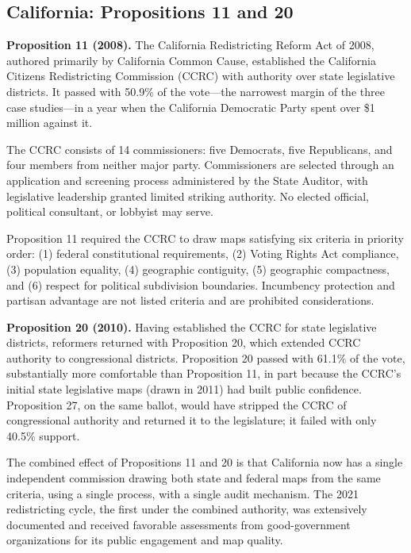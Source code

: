 \subsection{California: Propositions 11 and 20}

\textbf{Proposition 11 (2008).} The California Redistricting Reform Act of 2008, authored primarily by California Common Cause, established the California Citizens Redistricting Commission (CCRC) with authority over state legislative districts. It passed with 50.9\% of the vote---the narrowest margin of the three case studies---in a year when the California Democratic Party spent over \$1 million against it.

The CCRC consists of 14 commissioners: five Democrats, five Republicans, and four members from neither major party. Commissioners are selected through an application and screening process administered by the State Auditor, with legislative leadership granted limited striking authority. No elected official, political consultant, or lobbyist may serve.

Proposition 11 required the CCRC to draw maps satisfying six criteria in priority order: (1) federal constitutional requirements, (2) Voting Rights Act compliance, (3) population equality, (4) geographic contiguity, (5) geographic compactness, and (6) respect for political subdivision boundaries. Incumbency protection and partisan advantage are not listed criteria and are prohibited considerations.

\textbf{Proposition 20 (2010).} Having established the CCRC for state legislative districts, reformers returned with Proposition 20, which extended CCRC authority to congressional districts. Proposition 20 passed with 61.1\% of the vote, substantially more comfortable than Proposition 11, in part because the CCRC's initial state legislative maps (drawn in 2011) had built public confidence. Proposition 27, on the same ballot, would have stripped the CCRC of congressional authority and returned it to the legislature; it failed with only 40.5\% support.

The combined effect of Propositions 11 and 20 is that California now has a single independent commission drawing both state and federal maps from the same criteria, using a single process, with a single audit mechanism. The 2021 redistricting cycle, the first under the combined authority, was extensively documented and received favorable assessments from good-government organizations for its public engagement and map quality.


